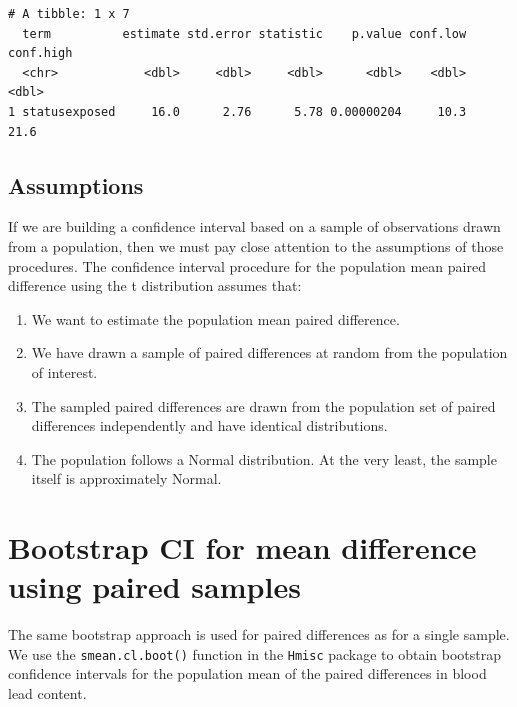 \documentclass[
]{book}
\newenvironment{Shaded}{\begin{snugshade}}{\end{snugshade}}
\newcommand{\DataTypeTok}[1]{\textcolor[rgb]{0.13,0.29,0.53}{#1}}
\newcommand{\DecValTok}[1]{\textcolor[rgb]{0.00,0.00,0.81}{#1}}
\newcommand{\FloatTok}[1]{\textcolor[rgb]{0.00,0.00,0.81}{#1}}
\newcommand{\KeywordTok}[1]{\textcolor[rgb]{0.13,0.29,0.53}{\textbf{#1}}}
\newcommand{\NormalTok}[1]{#1}
\newcommand{\OperatorTok}[1]{\textcolor[rgb]{0.81,0.36,0.00}{\textbf{#1}}}
\newcommand{\StringTok}[1]{\textcolor[rgb]{0.31,0.60,0.02}{#1}}
\providecommand{\tightlist}{%
  \setlength{\itemsep}{0pt}\setlength{\parskip}{0pt}}
\begin{document}
\begin{verbatim}
# A tibble: 1 x 7
  term          estimate std.error statistic    p.value conf.low conf.high
  <chr>            <dbl>     <dbl>     <dbl>      <dbl>    <dbl>     <dbl>
1 statusexposed     16.0      2.76      5.78 0.00000204     10.3      21.6
\end{verbatim}

\hypertarget{assumptions}{%
\subsection{Assumptions}\label{assumptions}}

If we are building a confidence interval based on a sample of observations drawn from a population, then we must pay close attention to the assumptions of those procedures. The confidence interval procedure for the population mean paired difference using the t distribution assumes that:

\begin{enumerate}
\def\labelenumi{\arabic{enumi}.}
\tightlist
\item
  We want to estimate the population mean paired difference.
\item
  We have drawn a sample of paired differences at random from the population of interest.
\item
  The sampled paired differences are drawn from the population set of paired differences independently and have identical distributions.
\item
  The population follows a Normal distribution. At the very least, the sample itself is approximately Normal.
\end{enumerate}

\hypertarget{bootstrap-ci-for-mean-difference-using-paired-samples}{%
\section{Bootstrap CI for mean difference using paired samples}\label{bootstrap-ci-for-mean-difference-using-paired-samples}}

The same bootstrap approach is used for paired differences as for a single sample. We use the \texttt{smean.cl.boot()} function in the \texttt{Hmisc} package to obtain bootstrap confidence intervals for the population mean of the paired differences in blood lead content.

\begin{Shaded}
\end{Shaded}
\end{document}
